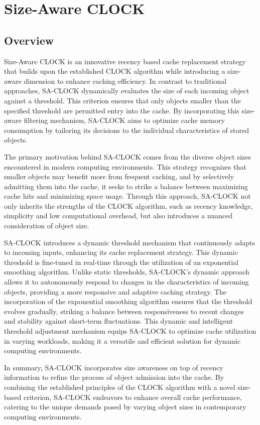 \documentclass[conference]{IEEEtran}
\begin{document}
\section{Size-Aware CLOCK}
\subsection{Overview}
Size-Aware CLOCK is an innovative recency based cache replacement strategy that builds upon the established CLOCK algorithm while introducing a size-aware dimension to enhance caching efficiency. In contrast to traditional approaches, SA-CLOCK dynamically evaluates the size of each incoming object against a threshold. This criterion ensures that only objects smaller than the specified threshold are permitted entry into the cache. By incorporating this size-aware filtering mechanism, SA-CLOCK aims to optimize cache memory consumption by tailoring its decisions to the individual characteristics of stored objects.

The primary motivation behind SA-CLOCK comes from the diverse object sizes encountered in modern computing environments. This strategy recognizes that smaller objects may benefit more from frequent caching, and by selectively admitting them into the cache, it seeks to strike a balance between maximizing cache hits and minimizing space usage. Through this approach, SA-CLOCK not only inherits the strengths of the CLOCK algorithm, such as recency knowledge, simplicity and low computational overhead, but also introduces a nuanced consideration of object size.

SA-CLOCK introduces a dynamic threshold mechanism that continuously adapts to incoming inputs, enhancing its cache replacement strategy. This dynamic threshold is fine-tuned in real-time through the utilization of an exponential smoothing algorithm. Unlike static thresholds, SA-CLOCK's dynamic approach allows it to autonomously respond to changes in the characteristics of incoming objects, providing a more responsive and adaptive caching strategy. The incorporation of the exponential smoothing algorithm ensures that the threshold evolves gradually, striking a balance between responsiveness to recent changes and stability against short-term fluctuations. This dynamic and intelligent threshold adjustment mechanism equips SA-CLOCK to optimize cache utilization in varying workloads, making it a versatile and efficient solution for dynamic computing environments.

In summary, SA-CLOCK incorporates size awareness on top of recency information to refine the process of object admission into the cache. By combining the established principles of the CLOCK algorithm with a novel size-based criterion, SA-CLOCK endeavors to enhance overall cache performance, catering to the unique demands posed by varying object sizes in contemporary computing environments.
\end{document}
